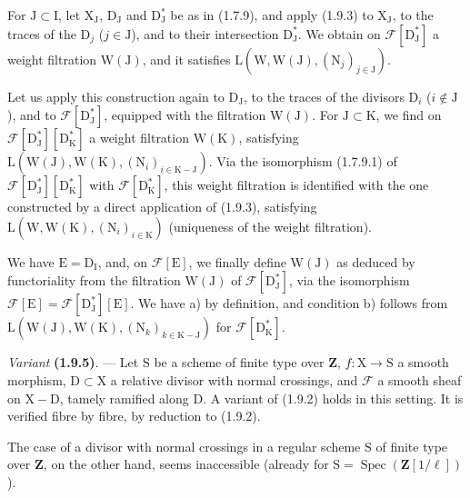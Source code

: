 \documentclass[11pt,leqno]{article}
\begin{document}
For \(\mathrm{J}\subset\mathrm{I}\), let \(\mathrm{X}_{\mathrm{J}}\), \(\mathrm{D}_{\mathrm{J}}\) and \(\mathrm{D}_{\mathrm{J}}^*\) be as in (1.7.9), and apply (1.9.3) to \(\mathrm{X}_{\mathrm{J}}\), to the traces of the \(\mathrm{D}_j\) (\(j\in\mathrm{J}\)), and to their intersection \(\mathrm{D}_{\mathrm{J}}^*\). We obtain on \(\mathscr{F}[\mathrm{D}_{\mathrm{J}}^*]\) a weight filtration \(\mathrm{W}(\mathrm{J})\), and it satisfies \(\mathrm{L}(\mathrm{W},\mathrm{W}(\mathrm{J}),(\mathrm{N}_j)_{j\in\mathrm{J}})\).

Let us apply this construction again to \(\mathrm{D}_{\mathrm{J}}\), to the traces of the divisors \(\mathrm{D}_i\) (\(i\notin\mathrm{J}\)), and to \(\mathscr{F}[\mathrm{D}_{\mathrm{J}}^*]\), equipped with the filtration \(\mathrm{W}(\mathrm{J})\). For \(\mathrm{J}\subset\mathrm{K}\), we find on \(\mathscr{F}[\mathrm{D}_{\mathrm{J}}^*][\mathrm{D}_{\mathrm{K}}^*]\) a weight filtration \(\mathrm{W}(\mathrm{K})\), satisfying \(\mathrm{L}(\mathrm{W}(\mathrm{J}),\mathrm{W}(\mathrm{K}),(\mathrm{N}_i)_{i\in\mathrm{K}-\mathrm{J}})\). Via the isomorphism (1.7.9.1) of \(\mathscr{F}[\mathrm{D}_{\mathrm{J}}^*][\mathrm{D}_{\mathrm{K}}^*]\) with \(\mathscr{F}[\mathrm{D}_{\mathrm{K}}^*]\), this weight filtration is identified with the one constructed by a direct application of (1.9.3), satisfying \(\mathrm{L}(\mathrm{W},\mathrm{W}(\mathrm{K}),(\mathrm{N}_i)_{i\in\mathrm{K}})\) (uniqueness of the weight filtration).

We have \(\mathrm{E}=\mathrm{D}_{\mathrm{I}}\), and, on \(\mathscr{F}[\mathrm{E}]\), we finally define \(\mathrm{W}(\mathrm{J})\) as deduced by functoriality from the filtration \(\mathrm{W}(\mathrm{J})\) of \(\mathscr{F}[\mathrm{D}_{\mathrm{J}}^*]\), via the isomorphism \(\mathscr{F}[\mathrm{E}]=\mathscr{F}[\mathrm{D}_{\mathrm{J}}^*][\mathrm{E}]\). We have a) by definition, and condition b) follows from \(\mathrm{L}(\mathrm{W}(\mathrm{J}),\mathrm{W}(\mathrm{K}),(\mathrm{N}_k)_{k\in\mathrm{K}-\mathrm{J}})\) for \(\mathscr{F}[\mathrm{D}_{\mathrm{K}}^*]\).

\textit{Variant} \textbf{(1.9.5)}. — Let \(\mathrm{S}\) be a scheme of finite type over \(\mathbf{Z}\), \(f:\mathrm{X}\to\mathrm{S}\) a smooth morphism, \(\mathrm{D}\subset\mathrm{X}\) a relative divisor with normal crossings, and \(\mathscr{F}\) a smooth sheaf on \(\mathrm{X}-\mathrm{D}\), tamely ramified along \(\mathrm{D}\). A variant of (1.9.2) holds in this setting. It is verified fibre by fibre, by reduction to (1.9.2).

The case of a divisor with normal crossings in a regular scheme \(\mathrm{S}\) of finite type over \(\mathbf{Z}\), on the other hand, seems inaccessible (already for \(\mathrm{S}=\operatorname{Spec}(\mathbf{Z}[1/\ell])\)).
\end{document}
